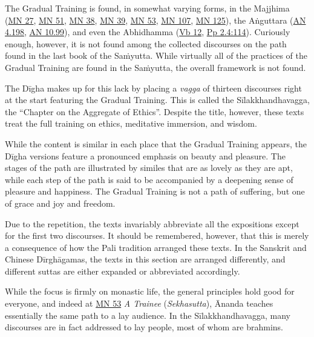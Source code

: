 \documentclass[12pt,openany]{book}%
\begin{document}
The Gradual Training is found, in somewhat varying forms, in the Majjhima (\href{https://suttacentral.net/mn27}{MN 27}, \href{https://suttacentral.net/mn51}{MN 51}, \href{https://suttacentral.net/mn38}{MN 38}, \href{https://suttacentral.net/mn39}{MN 39}, \href{https://suttacentral.net/mn53}{MN 53}, \href{https://suttacentral.net/mn107}{MN 107}, \href{https://suttacentral.net/mn125}{MN 125}), the \textsanskrit{Aṅguttara} (\href{https://suttacentral.net/an4.198}{AN 4.198}, \href{https://suttacentral.net/an10.99}{AN 10.99}), and even the Abhidhamma (\href{https://suttacentral.net/vb12}{Vb 12}, \href{https://suttacentral.net/pp2.4\#114}{Pp 2.4:114}). Curiously enough, however, it is not found among the collected discourses on the path found in the last book of the \textsanskrit{Saṁyutta}. While virtually all of the practices of the Gradual Training are found in the \textsanskrit{Saṁyutta}, the overall framework is not found.

The \textsanskrit{Dīgha} makes up for this lack by placing a \textit{vagga} of thirteen discourses right at the start featuring the Gradual Training. This is called the \textsanskrit{Sīlakkhandhavagga}, the “Chapter on the Aggregate of Ethics”. Despite the title, however, these texts treat the full training on ethics, meditative immersion, and wisdom.

While the content is similar in each place that the Gradual Training appears, the \textsanskrit{Dīgha} versions feature a pronounced emphasis on beauty and pleasure. The stages of the path are illustrated by similes that are as lovely as they are apt, while each step of the path is said to be accompanied by a deepening sense of pleasure and happiness. The Gradual Training is not a path of suffering, but one of grace and joy and freedom.

Due to the repetition, the texts invariably abbreviate all the expositions except for the first two discourses. It should be remembered, however, that this is merely a consequence of how the Pali tradition arranged these texts. In the Sanskrit and Chinese \textsanskrit{Dīrghāgamas}, the texts in this section are arranged differently, and different suttas are either expanded or abbreviated accordingly.

While the focus is firmly on monastic life, the general principles hold good for everyone, and indeed at \href{https://suttacentral.net/mn53}{MN 53} \textit{A Trainee} (\textit{Sekhasutta}), Ānanda teaches essentially the same path to a lay audience. In the \textsanskrit{Sīlakkhandhavagga}, many discourses are in fact addressed to lay people, most of whom are brahmins.
\end{document}
